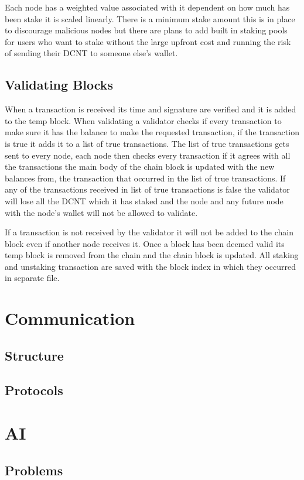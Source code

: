 \documentclass[11pt]{extarticle}
\begin{document}
Each node has a weighted value associated with it dependent on how much has been stake it is scaled linearly. There is a minimum stake amount this is in place to discourage malicious nodes but there are plans to add built in staking pools for users who want to stake without the large upfront cost and running the risk of sending their DCNT to someone else's wallet.
\subsection{Validating Blocks}
When a transaction is received its time and signature are verified and it is added to the temp block. When validating a validator checks if every transaction to make sure it has the balance to make the requested transaction, if the transaction is true it adds it to a list of true transactions. The list of true transactions gets sent to every node, each node then checks every transaction if it agrees with all the transactions the main body of the chain block is updated with the new balances from, the transaction that occurred in the list of true transactions. If any of the transactions received in list of true transactions is false the validator will lose all the DCNT which it has staked and the node and any future node with the node's wallet will not be allowed to validate.

If a transaction is not received by the validator it will not be added to the chain block even if another node receives it. Once a block has been deemed valid its temp block is removed from the chain and the chain block is updated. All staking and unstaking transaction are saved with the block index in which they occurred in separate file.


\section{Communication}
\subsection{Structure}
\subsection{Protocols}

\section{AI}
\subsection{Problems}



\end{document}
